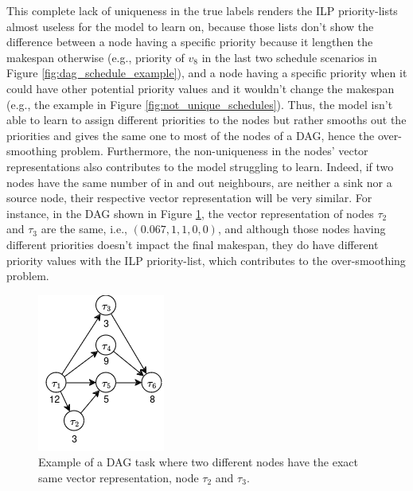 This complete lack of uniqueness in the true labels 
renders the ILP priority-lists almost useless
for the model to learn on, because those lists
don't show the difference between a node having 
a specific priority because it lengthen the makespan otherwise (e.g.,
priority of $v_8$ in the last two schedule scenarios in Figure \ref{fig:dag_schedule_example}),
and a node having a specific priority when it could have 
other potential priority values and it wouldn't change the makespan (e.g.,
the example in Figure \ref{fig:not_unique_schedules}).
Thus, the model isn't able to learn to assign different priorities
to the nodes but rather smooths out the priorities and gives
the same one to most of the nodes of a DAG,
hence the over-smoothing problem.
Furthermore, the non-uniqueness in the nodes' vector representations
also contributes to the model struggling to learn.
Indeed, 
if two nodes have the same number of in and out neighbours,
are neither a sink nor a source node, their respective
vector representation will be very similar.
For instance, in the DAG shown in Figure \ref{fig:dag_same_representation_vector},
the vector representation of nodes $\tau_2$ and $\tau_3$ are the same,
i.e., $(0.067, 1, 1, 0, 0)$, and although those nodes having different priorities
doesn't impact the final makespan, they do have different priority values
with the ILP priority-list, which contributes to the over-smoothing problem. 
\begin{figure}
    \centering
    \includegraphics[width=0.5\linewidth]{images/dag_similarity_representation.png}
    \caption{Example of a DAG task where two different nodes have the
    exact same vector representation, node $\tau_2$ and $\tau_3$.}
    \label{fig:dag_same_representation_vector}
\end{figure}

